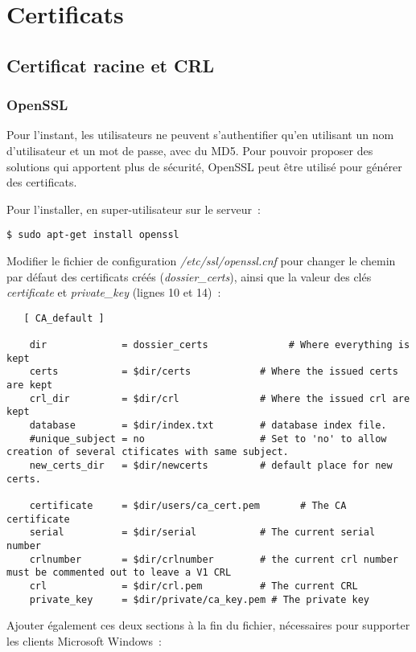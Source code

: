 \section{Certificats}
\subsection{Certificat racine et CRL}
\subsubsection{OpenSSL}

Pour l'instant, les utilisateurs ne peuvent s'authentifier qu'en utilisant un nom d'utilisateur et un mot de passe, avec du MD5. Pour pouvoir proposer des solutions qui apportent plus de sécurité, OpenSSL peut être utilisé pour générer des certificats.

Pour l'installer, en super-utilisateur sur le serveur~:

\begin{lstlisting}
$ sudo apt-get install openssl
\end{lstlisting}

Modifier le fichier de configuration \emph{/etc/ssl/openssl.cnf} pour changer le chemin par défaut des certificats créés (\emph{dossier\_certs}), ainsi que la valeur des clés \emph{certificate} et \emph{private\_key} (lignes 10 et 14)~:

\begin{lstlisting}
   [ CA_default ]

    dir             = dossier_certs              # Where everything is kept
    certs           = $dir/certs            # Where the issued certs are kept
    crl_dir         = $dir/crl              # Where the issued crl are kept
    database        = $dir/index.txt        # database index file.
    #unique_subject = no                    # Set to 'no' to allow creation of several ctificates with same subject.
    new_certs_dir   = $dir/newcerts         # default place for new certs.

    certificate     = $dir/users/ca_cert.pem       # The CA certificate
    serial          = $dir/serial           # The current serial number
    crlnumber       = $dir/crlnumber        # the current crl number must be commented out to leave a V1 CRL
    crl             = $dir/crl.pem          # The current CRL
    private_key     = $dir/private/ca_key.pem # The private key
\end{lstlisting}

Ajouter également ces deux sections à la fin du fichier, nécessaires pour supporter les clients Microsoft Windows~:

